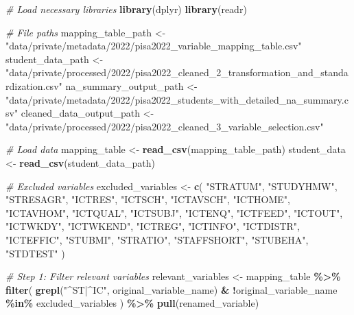 \documentclass[
]{article}
\newenvironment{Shaded}{\begin{snugshade}}{\end{snugshade}}
\newcommand{\CommentTok}[1]{\textcolor[rgb]{0.56,0.35,0.01}{\textit{#1}}}
\newcommand{\FunctionTok}[1]{\textcolor[rgb]{0.13,0.29,0.53}{\textbf{#1}}}
\newcommand{\NormalTok}[1]{#1}
\newcommand{\OtherTok}[1]{\textcolor[rgb]{0.56,0.35,0.01}{#1}}
\newcommand{\SpecialCharTok}[1]{\textcolor[rgb]{0.81,0.36,0.00}{\textbf{#1}}}
\newcommand{\StringTok}[1]{\textcolor[rgb]{0.31,0.60,0.02}{#1}}
\begin{document}
\begin{Shaded}
\begin{Highlighting}[]
\CommentTok{\# Load necessary libraries}
\FunctionTok{library}\NormalTok{(dplyr)}
\FunctionTok{library}\NormalTok{(readr)}

\CommentTok{\# File paths}
\NormalTok{mapping\_table\_path }\OtherTok{\textless{}{-}} \StringTok{"data/private/metadata/2022/pisa2022\_variable\_mapping\_table.csv"}
\NormalTok{student\_data\_path }\OtherTok{\textless{}{-}} \StringTok{"data/private/processed/2022/pisa2022\_cleaned\_2\_transformation\_and\_standardization.csv"}
\NormalTok{na\_summary\_output\_path }\OtherTok{\textless{}{-}} \StringTok{"data/private/metadata/2022/pisa2022\_students\_with\_detailed\_na\_summary.csv"}
\NormalTok{cleaned\_data\_output\_path }\OtherTok{\textless{}{-}} \StringTok{"data/private/processed/2022/pisa2022\_cleaned\_3\_variable\_selection.csv"}

\CommentTok{\# Load data}
\NormalTok{mapping\_table }\OtherTok{\textless{}{-}} \FunctionTok{read\_csv}\NormalTok{(mapping\_table\_path)}
\NormalTok{student\_data }\OtherTok{\textless{}{-}} \FunctionTok{read\_csv}\NormalTok{(student\_data\_path)}

\CommentTok{\# Excluded variables}
\NormalTok{excluded\_variables }\OtherTok{\textless{}{-}} \FunctionTok{c}\NormalTok{(}
  \StringTok{"STRATUM"}\NormalTok{, }\StringTok{"STUDYHMW"}\NormalTok{, }\StringTok{"STRESAGR"}\NormalTok{, }\StringTok{"ICTRES"}\NormalTok{, }\StringTok{"ICTSCH"}\NormalTok{, }\StringTok{"ICTAVSCH"}\NormalTok{, }\StringTok{"ICTHOME"}\NormalTok{, }
  \StringTok{"ICTAVHOM"}\NormalTok{, }\StringTok{"ICTQUAL"}\NormalTok{, }\StringTok{"ICTSUBJ"}\NormalTok{, }\StringTok{"ICTENQ"}\NormalTok{, }\StringTok{"ICTFEED"}\NormalTok{, }\StringTok{"ICTOUT"}\NormalTok{, }\StringTok{"ICTWKDY"}\NormalTok{, }
  \StringTok{"ICTWKEND"}\NormalTok{, }\StringTok{"ICTREG"}\NormalTok{, }\StringTok{"ICTINFO"}\NormalTok{, }\StringTok{"ICTDISTR"}\NormalTok{, }\StringTok{"ICTEFFIC"}\NormalTok{, }\StringTok{"STUBMI"}\NormalTok{, }\StringTok{"STRATIO"}\NormalTok{, }
  \StringTok{"STAFFSHORT"}\NormalTok{, }\StringTok{"STUBEHA"}\NormalTok{, }\StringTok{"STDTEST"}
\NormalTok{)}

\CommentTok{\# Step 1: Filter relevant variables}
\NormalTok{relevant\_variables }\OtherTok{\textless{}{-}}\NormalTok{ mapping\_table }\SpecialCharTok{\%\textgreater{}\%}
  \FunctionTok{filter}\NormalTok{(}
    \FunctionTok{grepl}\NormalTok{(}\StringTok{"\^{}ST|\^{}IC"}\NormalTok{, original\_variable\_name) }\SpecialCharTok{\&} 
      \SpecialCharTok{!}\NormalTok{original\_variable\_name }\SpecialCharTok{\%in\%}\NormalTok{ excluded\_variables}
\NormalTok{  ) }\SpecialCharTok{\%\textgreater{}\%}
  \FunctionTok{pull}\NormalTok{(renamed\_variable)}


\end{Highlighting}
\end{Shaded}
\end{document}
